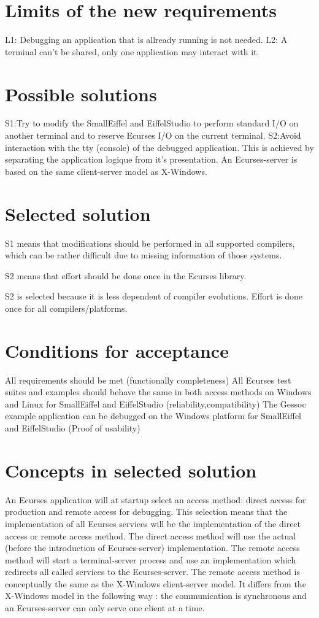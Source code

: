 \documentclass{article}
\begin{document}
\section{Limits of the new requirements}
L1: Debugging an application that is allready running is not needed.
L2: A terminal can't be shared, only one application may interact with it.

\section{Possible solutions}
S1:Try to modify the SmallEiffel and EiffelStudio to perform standard I/O on another terminal and to reserve Ecurses I/O on the current terminal.
S2:Avoid interaction with the tty (console) of the debugged application. This is achieved by separating the application logique from it's presentation. An Ecurses-server is based on the same client-server model as X-Windows.
 
\section{Selected solution}
S1 means that modifications should be performed in all supported compilers, which can be rather difficult due to missing
information of those systems.

S2 means that effort should be done once in the Ecurses library.

S2 is selected because it is less dependent of compiler evolutions. Effort is done once for all compilers/platforms.

\section{Conditions for acceptance}

All requirements should be met (functionally completeness)
All Ecurses test suites and examples should behave the same in both access methods on Windows and Linux for SmallEiffel and EiffelStudio (reliability,compatibility)
The Gessoc example application can be debugged on the Windows platform for SmallEiffel and EiffelStudio (Proof of usability)

\section{Concepts in selected solution}
An Ecurses application will at startup select an access method: direct access for production and remote access for debugging. This selection means that the implementation of all Ecurses services will be the implementation of the direct access or remote access method. 
The direct access method will use the actual (before the introduction of Ecurses-server) implementation.
The remote access method will start a terminal-server process and use an implementation which redirects all called services to the Ecurses-server. The remote access method is conceptually the same as the X-Windows client-server model. It differs from the X-Windows model in the following way : the communication is synchronous and an Ecurses-server can only serve one client at a time. 
\end{document}
